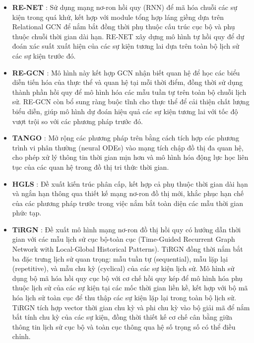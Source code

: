 \begin{itemize}
    \item \textbf{RE-NET} \cite{ref_article12}: Sử dụng mạng nơ-ron hồi quy (RNN) để mã hóa chuỗi các sự kiện trong quá khứ, kết hợp với module tổng hợp láng giềng dựa trên Relational GCN để nắm bắt đồng thời phụ thuộc cấu trúc cục bộ và phụ thuộc chuỗi thời gian dài hạn. RE-NET xây dựng mô hình tự hồi quy để dự đoán xác suất xuất hiện của các sự kiện tương lai dựa trên toàn bộ lịch sử các sự kiện trước đó.
    \item \textbf{RE-GCN} \cite{ref_article13}: Mô hình này kết hợp GCN nhận biết quan hệ để học các biểu diễn tiến hóa của thực thể và quan hệ tại mỗi thời điểm, đồng thời sử dụng thành phần hồi quy để mô hình hóa các mẫu tuần tự trên toàn bộ chuỗi lịch sử. RE-GCN còn bổ sung ràng buộc tĩnh cho thực thể để cải thiện chất lượng biểu diễn, giúp mô hình dự đoán hiệu quả các sự kiện tương lai với tốc độ vượt trội so với các phương pháp trước đó.
    \item \textbf{TANGO} \cite{ref_article33}: Mở rộng các phương pháp trên bằng cách tích hợp các phương trình vi phân thường (neural ODEs) vào mạng tích chập đồ thị đa quan hệ, cho phép xử lý thông tin thời gian mịn hơn và mô hình hóa động lực học liên tục của các quan hệ trong đồ thị tri thức thời gian.
    \item \textbf{HGLS} \cite{ref_article14}: Đề xuất kiến trúc phân cấp, kết hợp cả phụ thuộc thời gian dài hạn và ngắn hạn thông qua thiết kế mạng nơ-ron đồ thị mới, khắc phục hạn chế của các phương pháp trước trong việc nắm bắt toàn diện các mẫu thời gian phức tạp.
    \item \textbf{TiRGN} \cite{ref_article22}: Đề xuất mô hình mạng nơ-ron đồ thị hồi quy có hướng dẫn thời gian với các mẫu lịch sử cục bộ-toàn cục (Time-Guided Recurrent Graph Network with Local-Global Historical Patterns). TiRGN đồng thời nắm bắt ba đặc trưng lịch sử quan trọng: mẫu tuần tự (sequential), mẫu lặp lại (repetitive), và mẫu chu kỳ (cyclical) của các sự kiện lịch sử. Mô hình sử dụng bộ mã hóa hồi quy cục bộ với cơ chế hồi quy kép để mô hình hóa phụ thuộc lịch sử của các sự kiện tại các mốc thời gian liền kề, kết hợp với bộ mã hóa lịch sử toàn cục để thu thập các sự kiện lặp lại trong toàn bộ lịch sử. TiRGN tích hợp vector thời gian chu kỳ và phi chu kỳ vào bộ giải mã để nắm bắt tính chu kỳ của các sự kiện, đồng thời thiết kế cơ chế cân bằng giữa thông tin lịch sử cục bộ và toàn cục thông qua hệ số trọng số có thể điều chỉnh.
\end{itemize}

